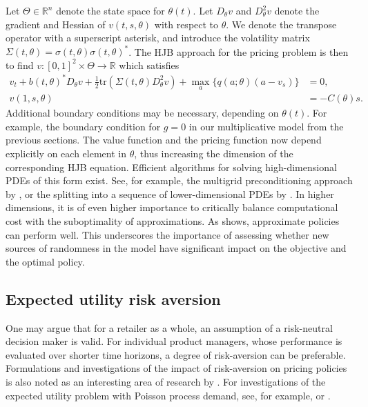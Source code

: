 \documentclass[main.tex]{subfiles}
\begin{document}
Let $\Theta\in\mathbb R^n$ denote the state space for
$\theta(t)$.
Let $D_\theta v$ and $D_\theta^2v$ denote the gradient and Hessian of
$v(t,s,\theta)$ with respect to $\theta$. We denote the transpose
operator with a superscript asterisk, and introduce the
volatility matrix $\Sigma(t,\theta) = \sigma(t,\theta){\sigma(t,\theta)}^*$.
The HJB approach for the pricing problem is then to find
$v:{[0,1]}^2\times\Theta\to\mathbb R$ which satisfies
\begin{align}
  v_t+{b(t,\theta)}^* D_\theta v
  + {\textstyle\frac{1}{2}}\mbox{tr}\left( \Sigma(t,\theta)
  D_\theta^2v \right)
  +\max_{a}\{q(a;\theta)(a-v_s)\}&=0,\\
  v(1,s,\theta) &= -C(\theta)s.
\end{align}
Additional boundary conditions may be necessary, depending on
$\theta(t)$. For example, the boundary condition for $g=0$ in our
multiplicative model from the previous sections.
The value function and the pricing function now depend
explicitly on each element in $\theta$, thus increasing the dimension
of the corresponding HJB equation. Efficient algorithms for solving
high-dimensional PDEs of this form exist. See, for example, the
multigrid preconditioning approach by \citet{reisinger2017boundary}, or
the splitting into a sequence of lower-dimensional PDEs by \citet{reisinger2017finite}.
In higher dimensions, it is of even higher importance to critically
balance computational cost with the suboptimality of
approximations. As  shows, approximate
policies can perform well. This underscores the importance of assessing whether
new sources of randomness in the model have significant impact on the
objective and the optimal policy.


\subsection{Expected utility risk aversion}
One may argue that for a retailer as a whole, an assumption of a
risk-neutral decision maker is valid. For individual product managers,
whose performance is evaluated over shorter time horizons, a degree of
risk-aversion can be preferable. Formulations and investigations of the
impact of risk-aversion on pricing policies is also noted as an
interesting area of research by \citet{bitran2003overview}.
For investigations of the expected utility problem with Poisson process
demand, see, for example, \citet{lim2007relative} or \citet{feng2008risk}.
\end{document}
